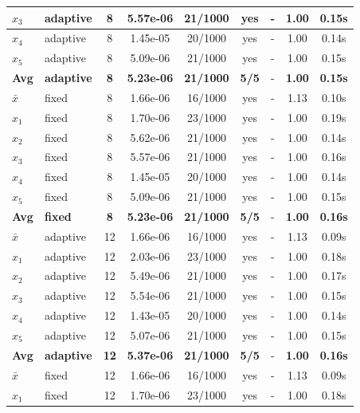\begin{longtable}{|l|l|c|c|c|c|c|c|c|}
\hline
$x_3$ & adaptive & 8 & 5.57e-06 & 21/1000 & yes & - & 1.00 & 0.15s \\
\hline
$x_4$ & adaptive & 8 & 1.45e-05 & 20/1000 & yes & - & 1.00 & 0.14s \\
\hline
$x_5$ & adaptive & 8 & 5.09e-06 & 21/1000 & yes & - & 1.00 & 0.15s \\
\hline
\hline\hline
\textbf{Avg} & \textbf{adaptive} & \textbf{8} & \textbf{5.23e-06} & \textbf{21/1000} & \textbf{5/5} & - & \textbf{1.00} & \textbf{0.15s} \\
\hline\hline
\hline
$\bar{x}$ & fixed & 8 & 1.66e-06 & 16/1000 & yes & - & 1.13 & 0.10s \\
\hline
$x_1$ & fixed & 8 & 1.70e-06 & 23/1000 & yes & - & 1.00 & 0.19s \\
\hline
$x_2$ & fixed & 8 & 5.62e-06 & 21/1000 & yes & - & 1.00 & 0.14s \\
\hline
$x_3$ & fixed & 8 & 5.57e-06 & 21/1000 & yes & - & 1.00 & 0.16s \\
\hline
$x_4$ & fixed & 8 & 1.45e-05 & 20/1000 & yes & - & 1.00 & 0.14s \\
\hline
$x_5$ & fixed & 8 & 5.09e-06 & 21/1000 & yes & - & 1.00 & 0.15s \\
\hline
\hline\hline
\textbf{Avg} & \textbf{fixed} & \textbf{8} & \textbf{5.23e-06} & \textbf{21/1000} & \textbf{5/5} & - & \textbf{1.00} & \textbf{0.16s} \\
\hline\hline
$\bar{x}$ & adaptive & 12 & 1.66e-06 & 16/1000 & yes & - & 1.13 & 0.09s \\
\hline
$x_1$ & adaptive & 12 & 2.03e-06 & 23/1000 & yes & - & 1.00 & 0.18s \\
\hline
$x_2$ & adaptive & 12 & 5.49e-06 & 21/1000 & yes & - & 1.00 & 0.17s \\
\hline
$x_3$ & adaptive & 12 & 5.54e-06 & 21/1000 & yes & - & 1.00 & 0.15s \\
\hline
$x_4$ & adaptive & 12 & 1.43e-05 & 20/1000 & yes & - & 1.00 & 0.14s \\
\hline
$x_5$ & adaptive & 12 & 5.07e-06 & 21/1000 & yes & - & 1.00 & 0.15s \\
\hline
\hline\hline
\textbf{Avg} & \textbf{adaptive} & \textbf{12} & \textbf{5.37e-06} & \textbf{21/1000} & \textbf{5/5} & - & \textbf{1.00} & \textbf{0.16s} \\
\hline\hline
\hline
$\bar{x}$ & fixed & 12 & 1.66e-06 & 16/1000 & yes & - & 1.13 & 0.09s \\
\hline
$x_1$ & fixed & 12 & 1.70e-06 & 23/1000 & yes & - & 1.00 & 0.18s \\

\end{longtable}
